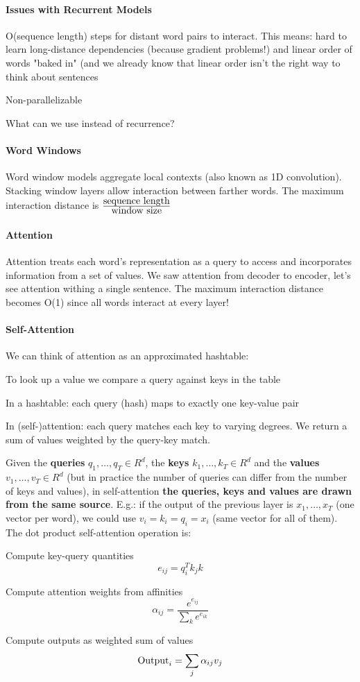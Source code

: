 \documentclass[10pt]{report}
\begin{document}
\paragraph{Issues with Recurrent Models}\begin{list}{}{}
	\item O(sequence length) steps for distant word pairs to interact. This means: hard to learn long-distance dependencies (because gradient problems!) and linear order of words "baked in" (and we already know that linear order isn't the right way to think about sentences
	\item Non-parallelizable
\end{list}
What can we use instead of recurrence?
\paragraph{Word Windows} Word window models aggregate local contexts (also known as 1D convolution). Stacking window layers allow interaction between farther words. The maximum interaction distance is $\frac{\hbox{sequence length}}{\hbox{window size}}$
\paragraph{Attention} Attention treats each word's representation as a query to access and incorporates information from a set of values. We saw attention from decoder to encoder, let's see attention withing a single sentence. The maximum interaction distance becomes O(1) since all words interact at every layer!
\paragraph{Self-Attention}
We can think of attention as an approximated hashtable:
\begin{list}{}{}
	\item To look up a value we compare a query against keys in the table
	\item In a hashtable: each query (hash) maps to exactly one key-value pair
	\item In (self-)attention: each query matches each key to varying degrees. We return a sum of values weighted by the query-key match.
\end{list}
Given the \textbf{queries} $q_1,\ldots,q_T\in R^d$, the \textbf{keys} $k_1,\ldots,k_T\in R^d$ and the \textbf{values} $v_1,\ldots,v_T\in R^d$ (but in practice the number of queries can differ from the number of keys and values), in self-attention \textbf{the queries, keys and values are drawn from the same source}. E.g.: if the output of the previous layer is $x_1,\ldots,x_T$ (one vector per word), we could use $v_i=k_i=q_i=x_i$ (same vector for all of them).\\
The dot product self-attention operation is:
\begin{list}{}{}
	\item Compute key-query quantities $$e_{ij} = q_i^Tk_jk$$
	\item Compute attention weights from affinities $$\alpha_{ij}=\frac{e^{e_{ij}}}{\sum_k e^{e_{ik}}}$$
	\item Compute outputs as weighted sum of values $$\hbox{Output}_i=\sum_j\alpha_{ij}v_j$$
\end{list}
\end{document}
